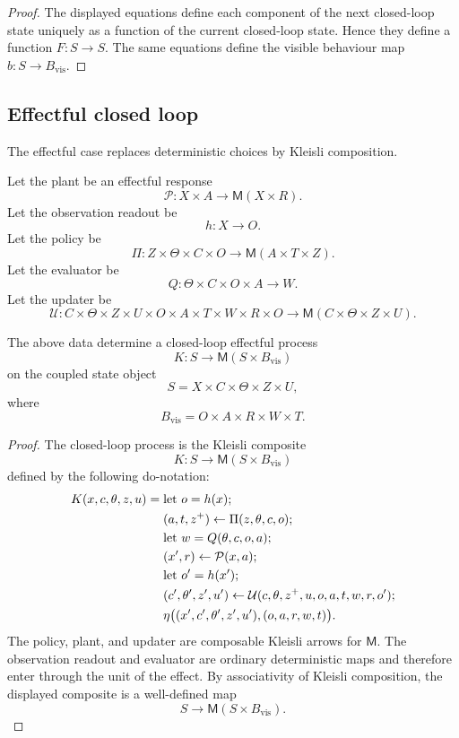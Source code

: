 \begin{proof}
The displayed equations define each component of the next closed-loop state uniquely as a function
of the current closed-loop state.  Hence they define a function \(F:S\to S\).  The same equations
define the visible behaviour map \(b:S\to B_{\mathrm{vis}}\).
\end{proof}

\subsection{Effectful closed loop}
\label{subsec:effectful-closed-loop}

The effectful case replaces deterministic choices by Kleisli composition.

Let the plant be an effectful response
\[
\mathcal P:X\times A\longrightarrow \mathsf M(X\times R).
\]
Let the observation readout be
\[
h:X\to O.
\]
Let the policy be
\[
\Pi:Z\times\Theta\times C\times O
\longrightarrow
\mathsf M(A\times T\times Z).
\]
Let the evaluator be
\[
Q:\Theta\times C\times O\times A\to W.
\]
Let the updater be
\[
\mathcal U:
C\times\Theta\times Z\times U
\times O\times A\times T\times W\times R\times O
\longrightarrow
\mathsf M(C\times\Theta\times Z\times U).
\]

\begin{theorem}
\label{thm:closed-loop-effectful-process}
The above data determine a closed-loop effectful process
\[
K:S\to \mathsf M(S\times B_{\mathrm{vis}})
\]
on the coupled state object
\[
S=X\times C\times\Theta\times Z\times U,
\]
where
\[
B_{\mathrm{vis}}=O\times A\times R\times W\times T.
\]
\end{theorem}

\begin{proof}
The closed-loop process is the Kleisli composite
\[
K:S\to \mathsf M(S\times B_{\mathrm{vis}})
\]
defined by the following do-notation:
\[
\begin{aligned}
K(x,c,\theta,z,u)
=
{}&
\text{\rm let } o=h(x) \text{\rm ;}\\
&
(a,t,z^+)\leftarrow \Pi(z,\theta,c,o);\\
&
\text{\rm let } w=Q(\theta,c,o,a) \text{\rm ;}\\
&
(x',r)\leftarrow \mathcal P(x,a);\\
&
\text{\rm let } o'=h(x') \text{\rm ;}\\
&
(c',\theta',z',u')
\leftarrow
\mathcal U(c,\theta,z^+,u,o,a,t,w,r,o');\\
&
\eta\bigl((x',c',\theta',z',u'),(o,a,r,w,t)\bigr).
\end{aligned}
\]
The policy, plant, and updater are composable Kleisli arrows for \(\mathsf M\).  The observation
readout and evaluator are ordinary deterministic maps and therefore enter through the unit of the
effect.  By associativity of Kleisli composition, the displayed composite is a well-defined map
\[
S\to \mathsf M(S\times B_{\mathrm{vis}}).
\]
\end{proof}

